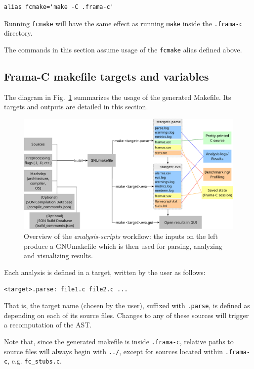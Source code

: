 \begin{verbatim}
alias fcmake='make -C .frama-c'
\end{verbatim}

Running \texttt{fcmake} will have the same effect as running \texttt{make}
inside the \texttt{.frama-c} directory.

The commands in this section assume usage of the \texttt{fcmake} alias
defined above.

\subsection*{Frama-C makefile targets and variables}

The diagram in Fig.~\ref{fig:analysis-scripts} summarizes the usage of
the generated Makefile. Its targets and outputs are detailed in this section.

\begin{figure}[htbp]
  \begin{center}
    \includegraphics[width=\textwidth]{analysis-scripts.pdf}
    \caption{Overview of the {\em analysis-scripts} workflow:
      the inputs on the left produce a GNUmakefile which is then used
      for parsing, analyzing and visualizing results.}
    \label{fig:analysis-scripts}
  \end{center}
\end{figure}

Each analysis is defined in a target, written by the user as follows:

\texttt{<target>.parse: file1.c file2.c ...}

That is, the target name (chosen by the user), suffixed with \texttt{.parse},
is defined as depending on each of its source files. Changes to any of these
sources will trigger a recomputation of the AST.

Note that, since the generated makefile is inside \texttt{.frama-c}, relative
paths to source files will always begin with \texttt{../}, except for
sources located within \texttt{.frama-c}, e.g. \texttt{fc\_stubs.c}.

